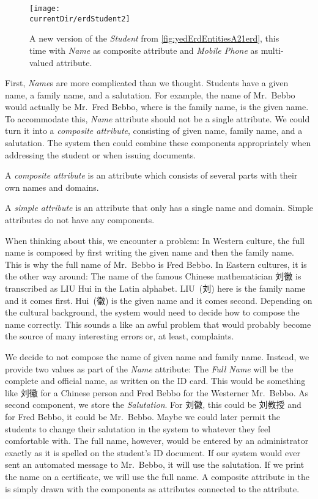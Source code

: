 \begin{figure}%
\centering%
\texttt{[image: \\currentDir/erdStudent2]}%
\caption{A new version of the \emph{Student}  from \cref{fig:yedErdEntitiesA21erd}, this time with \emph{Name} as composite attribute and \emph{Mobile Phone} as multi-valued attribute.}%
\label{fig:erdStudent2}%
\end{figure}%
%
First, \emph{Name}s are more complicated than we thought.
Students have a given name, a family name, and a salutation.
For example, the name of Mr.~Bebbo would actually be Mr.~Fred Bebbo, where  is the family name,  is the given name.
To accommodate this, \emph{Name} attribute should not be a single attribute.
We could turn it into a \emph{composite attribute}, consisting of given name, family name, and a salutation.
The system then could combine these components appropriately when addressing the student or when issuing documents.%
%
\begin{definition}%
A \emph{composite attribute} is an attribute which consists of several parts with their own names and domains.%
\end{definition}%
\begin{definition}%
A \emph{simple attribute} is an attribute that only has a single name and domain. %
Simple attributes do not have any components.%
\end{definition}%
%
%
When thinking about this, we encounter a problem:
In Western culture, the full name is composed by first writing the given name and then the family name.
This is why the full name of Mr.~Bebbo is Fred Bebbo.
In Eastern cultures, it is the other way around:
The name of the famous Chinese mathematician 刘徽 is transcribed as LIU Hui in the Latin alphabet.
LIU~(刘) here is the family name and it comes first.
Hui~(徽) is the given name and it comes second.
Depending on the cultural background, the system would need to decide how to compose the name correctly.
This sounds a like an awful problem that would probably become the source of many interesting errors or, at least, complaints.

We decide to not compose the name of given name and family name.
Instead, we provide two values as part of the \emph{Name} attribute:
The \emph{Full Name} will be the complete and official name, as written on the ID card.
This would be something like 刘徽 for a Chinese person and Fred Bebbo for the Westerner Mr.~Bebbo.
As second component, we store the \emph{Salutation}.
For 刘徽, this could be 刘教授 and for Fred Bebbo, it could be Mr.~Bebbo.
Maybe we could later permit the students to change their salutation in the system to whatever they feel comfortable with.
The full name, however, would be entered by an administrator exactly as it is spelled on the student's ID document.
If our system would ever sent an automated message to Mr.~Bebbo, it will use the salutation.
If we print the name on a certificate, we will use the full name.
A composite attribute in the  is simply drawn with the components as attributes connected to the attribute.

